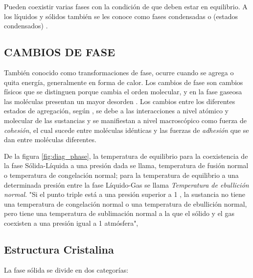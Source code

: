     Pueden coexistir varias fases con la condición de que deben estar en equilibrio. A los líquidos y sólidos también se les conoce como fases condensadas o (estados condensados) \parencite[p. 430]{SilberberglQmcGeneral}. 

\subsection{CAMBIOS DE FASE}
    También conocido como transformaciones de fase, ocurre cuando se agrega o quita energía, generalmente en forma de calor. Los cambios de fase son cambios físicos que se distinguen porque  cambia el orden molecular, y en la fase gaseosa las moléculas presentan un mayor desorden \parencite[p. 489]{ChangQmc2010}. Los cambios entre los diferentes estados de agregación, según \parencite{ReyesChumacero2012}, se debe a las interacciones a nivel atómico y molecular de las sustancias y se manifiestan a nivel macroscópico como fuerza de {\it cohesión}, el cual sucede entre moléculas idénticas y las fuerzas de {\it adhesión} que se dan entre moléculas diferentes.

     

De la figura \ref{fig:diag_phase}, la temperatura de equilibrio para la coexistencia de la fase Sólida-Líquida a una presión dada se llama, temperatura de fusión normal o temperatura de congelación normal; para la temperatura de equilibrio a una determinada presión entre la fase Líquido-Gas se llama {\it Temperatura de ebullición normal}. "Si el punto triple está a una presión superior a 1 , la sustancia no tiene una temperatura de congelación normal o una temperatura de ebullición normal, pero tiene una temperatura de sublimación normal a la que el sólido y el gas coexisten a una presión igual a 1 atmósfera", \parencite[pp. 28]{Mortimer2008} %

\subsection{Estructura Cristalina}
    La fase sólida se divide en dos categorías:

